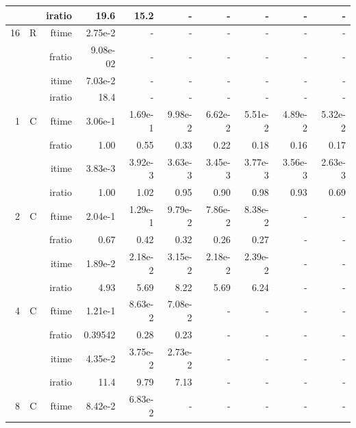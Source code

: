 \documentclass[a4paper]{article}
\begin{document}
\begin{table}[htbp]
\begin{center}
\begin{small}
\begin{tabular}{|r|r|r|r|r|r|r|r|r|r|}
             &             &  iratio &    19.6 &   15.2 &     - &      - &      - &      - &      - \\\hline
   16 &   R &   ftime &    2.75e-2 &      - &      - &      - &      - &      - &      - \\
             &             &  fratio &    9.08e-02 &     - &      - &      - &      - &      - &      - \\
             &             &  itime &    7.03e-2 &      - &      - &      - &      - &      - &      - \\
             &             &  iratio &    18.4 &     - &      - &      - &      - &      - &      - \\\hline\hline
   1 &   C &  ftime &    3.06e-1 &    1.69e-1 &    9.98e-2 &    6.62e-2 &    5.51e-2 &    4.89e-2 &    5.32e-2 \\
             &             &  fratio &    1.00 &    0.55 &    0.33 &   0.22 &    0.18 &    0.16 &    0.17 \\
             &             &  itime &    3.83e-3 &    3.92e-3 &    3.63e-3 &    3.45e-3 &    3.77e-3 &    3.56e-3 &    2.63e-3 \\
             &             &  iratio &    1.00 &    1.02  &    0.95 &    0.90 &    0.98 &    0.93 &   0.69 \\\hline
   2 &  C &  ftime &    2.04e-1 &    1.29e-1 &    9.79e-2 &    7.86e-2 &    8.38e-2 &      - &      - \\
             &             &  fratio &    0.67 &    0.42 &   0.32 &    0.26 &    0.27 &      - &      - \\
             &             &  itime &    1.89e-2 &    2.18e-2 &    3.15e-2 &    2.18e-2 &    2.39e-2 &      - &      - \\
             &             &  iratio &    4.93  &    5.69  &    8.22  &    5.69  &    6.24  &      - &      - \\\hline
   4 &  C &  ftime &    1.21e-1 &    8.63e-2 &    7.08e-2 &      - &      - &      - &      - \\
             &             &  fratio &    0.39542 &    0.28 &    0.23 &      - &      - &      - &      - \\
             &             &  itime &    4.35e-2 &    3.75e-2 &    2.73e-2 &      - &      - &      - &      - \\
             &             &  iratio &    11.4 &   9.79  &    7.13  &      - &      - &      - &      - \\\hline
   8 &   C &  ftime &    8.42e-2 &    6.83e-2 &      - &      - &      - &      - &      - \\

\end{tabular}
\end{small}
\end{center}
\end{table}
\end{document}
